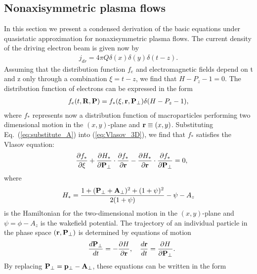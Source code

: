 \documentclass[twocolumn,showpacs,aip]{revtex4}
\begin{document}
\begin{appendix}
\section{Nonaxisymmetric plasma flows} 
In this section we present a condensed derivation of the basic equations under quasistatic approximation for nonaxisymmetric plasma flows. The current   density of the driving electron  beam   is given now by
\begin{eqnarray}
j_{dr}=
4\pi Q\delta(x)\delta(y)\delta(t-z).\label{eq:driver}
\end{eqnarray}
Assuming that the distribution function
$f_e$ and electromagnetic fields depend on t and z only
through a combination $\xi=t-z$, we find that $H-P_z-1=0$. The distribution function of electrons can be expressed in the form
\begin{eqnarray}
f_e(t,{\bf{R}},{\bf{P}})=f_{*}(\xi,{\bf{r}},{\bf{P}}_{\perp})\delta(H -P_z-1),
\label{eq:substitute_A}
\end{eqnarray}
where $f_*$ represents now a distribution function    of macroparticles performing two dimensional  motion in the $(x,y)$-plane and ${\bf{r}}\equiv(x,y)$.
Substituting Eq.~(\ref{eq:substitute_A}) into (\ref{eq:Vlasov_3D}), we find that $f_*$ satisfies the  Vlasov equation:
\begin{eqnarray}
&&\frac{\partial {f}_*}{\partial \xi} +\frac{\partial H_*}{\partial {\bf{P}}_{\perp}}\cdot\frac{\partial f_*}{\partial {\bf{r}}}-\frac{\partial H_*}{\partial {\bf{r}}}\cdot\frac{\partial f_*}{\partial {\bf{P}}_{\perp}}=0,\label{eq:Vlasov_2D_A}
\end{eqnarray}
where 
\begin{eqnarray}
 H_*=\frac{1+({\bf{P}}_{\perp}+{\bf{A}}_{\perp})^2+(1+\psi)^2}{2(1+\psi)}-\psi-A_z\label{eq:H_2D_A}
\end{eqnarray}
is the  Hamiltonian for the two-dimensional motion in the $(x,y)$-plane and $\psi=\phi-A_z$ is the wakefield potential.  The trajectory of an individual particle in the phase space $({\bf{r}},{\bf{P}}_{\perp})$  is determined by equations of motion
\begin{eqnarray}
&&\frac{d{\bf{P}}_{\perp}}{dt}=-\frac{\partial H}{\partial {\bf{r}}}, \quad \frac{d{\bf{r}}}{dt}=\frac{\partial H}{\partial {\bf{P}}_{\perp}}.
\label{eq:EoM_2D_A}
\end{eqnarray}
By replacing ${\bf{P}}_{\perp}={\bf{p}}_{\perp}-{\bf{A}}_{\perp}$, these equations  can be written in the form

\end{appendix}
\end{document}
